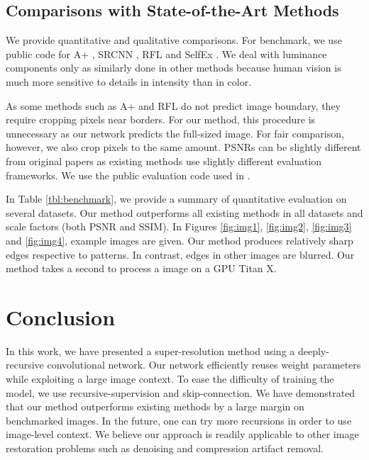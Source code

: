 \documentclass[10pt,twocolumn,letterpaper]{article}
\begin{document}
\subsection{Comparisons with State-of-the-Art Methods}
We provide quantitative and qualitative comparisons. For benchmark, we use public code for A+ \cite{Timofte}, SRCNN \cite{dong2014image}, RFL \cite{schulter2015fast} and  SelfEx \cite{Huang-CVPR-2015}. We deal with luminance components only as similarly done in other methods because human vision is much more sensitive to details in intensity than in color.

As  some methods such as A+ \cite{Timofte} and  RFL \cite{schulter2015fast} do not predict image boundary, they require cropping pixels near borders. For our method, this procedure is unnecessary as our network predicts the full-sized image. For fair comparison, however, we also crop pixels to the same amount. PSNRs can be slightly different from original papers as existing methods use slightly different evaluation frameworks. We use the public evaluation code used in \cite{Huang-CVPR-2015}.

In Table \ref{tbl:benchmark}, we provide a summary of quantitative evaluation on several datasets. 
Our method outperforms all existing methods in all datasets and scale factors (both PSNR and SSIM). In Figures \ref{fig:img1}, \ref{fig:img2}, \ref{fig:img3} and \ref{fig:img4}, example images are given. Our method produces relatively sharp edges respective to patterns. In contrast, edges in other images are blurred. Our method takes a second to process a  image on a GPU Titan X.

\section{Conclusion}
In this work, we have presented a super-resolution method using a deeply-recursive convolutional network. Our network efficiently reuses weight parameters while exploiting a large image context. To ease the difficulty of training the model, we use recursive-supervision and skip-connection. We have demonstrated that our method outperforms existing methods by a large margin on benchmarked images. In the future, one can try more recursions in order to use image-level context. We believe our approach is readily applicable to other image restoration problems such as denoising and compression artifact removal.

{\small
	
	
}
\end{document}
